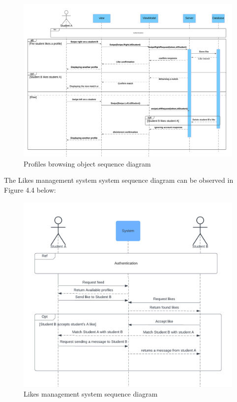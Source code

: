 \begin{figure}[H] 
            \centering
            \includegraphics[scale=0.4]{diagrams/profile browsing seq diagram.png}
            \caption{Profiles browsing object sequence diagram} 
            \label{fig: Profiles browsing object sequence diagram}
\end{figure}

The Likes management system system sequence diagram can be observed in Figure 4.4 below:

\begin{figure}[H] 
            \centering
            \includegraphics[scale=0.7]{diagrams/Sequence diagram like management.png}
            \caption{Likes management system sequence diagram} 
            \label{fig: Likes management system sequence diagram}
\end{figure}

